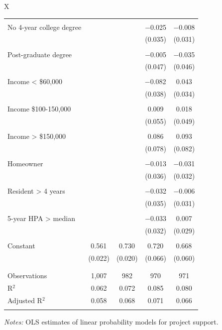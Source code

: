 \documentclass[article,11pt]{memoir}
\begin{document}
\begin{table}
\begin{threeparttable}
\begin{tabularx}{\linewidth}{X}
\begin{tabular}{@{\extracolsep{5pt}}lcccc}
    & & & & \\ 
   No 4-year college degree &  &  & $-$0.025 & $-$0.008 \\ 
    &  &  & (0.035) & (0.031) \\ 
    & & & & \\ 
   Post-graduate degree &  &  & $-$0.005 & $-$0.035 \\ 
    &  &  & (0.047) & (0.046) \\ 
    & & & & \\ 
   Income < \$60,000 &  &  & $-$0.082$^{}$ & 0.043 \\ 
    &  &  & (0.038) & (0.034) \\ 
    & & & & \\ 
   Income \$100-150,000 &  &  & 0.009 & 0.018 \\ 
    &  &  & (0.055) & (0.049) \\ 
    & & & & \\ 
   Income > \$150,000 &  &  & 0.086 & 0.093 \\ 
    &  &  & (0.078) & (0.082) \\ 
    & & & & \\ 
   Homeowner &  &  & $-$0.013 & $-$0.031 \\ 
    &  &  & (0.036) & (0.032) \\ 
    & & & & \\ 
   Resident > 4 years &  &  & $-$0.032 & $-$0.006 \\ 
    &  &  & (0.035) & (0.031) \\ 
    & & & & \\ 
   5-year HPA > median &  &  & $-$0.033 & 0.007 \\ 
    &  &  & (0.032) & (0.029) \\ 
    & & & & \\ 
   Constant & 0.561$^{}$ & 0.730$^{}$ & 0.720$^{}$ & 0.668$^{}$ \\ 
    & (0.022) & (0.020) & (0.066) & (0.060) \\ 
    & & & & \\ 
  \hline \\[-1.8ex] 
  Observations & 1,007 & 982 & 970 & 971 \\ 
  R$^{2}$ & 0.062 & 0.072 & 0.085 & 0.080 \\ 
  Adjusted R$^{2}$ & 0.058 & 0.068 & 0.071 & 0.066 \\ 
  \hline 
  \hline \\[-1.8ex] 
  \end{tabular}   

  \end{tabularx}
  \begin{tablenotes}[flushleft]
    \item \hspace{-.2em}\emph{Notes:} OLS estimates of linear probability models for project support.
  \end{tablenotes}
  \end{threeparttable}
\end{table}
\end{document}
